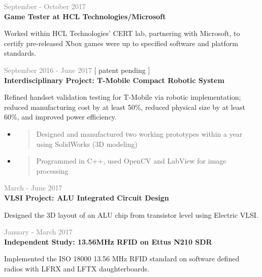 \documentclass[letterpage]{article}
\begin{document}
\begin{minipage}[t]{0.61\linewidth}
\vspace{7px}
\textcolor{gray}{September - October 2017}\\
\textbf{\textsf{Game Tester at HCL Technologies/Microsoft}}\\
\raggedright
Worked within HCL Technologies' CERT lab, partnering with
Microsoft, to certify pre-released Xbox games were
up to specified software and platform standards.

\vspace{7px}
\textcolor{gray}{September 2016 - June 2017}
\quad 
\textcolor{brilliant-azure}{[ patent pending ]}
\\
\textbf{\textsf{Interdisciplinary Project:
		T-Mobile Compact Robotic System}}\\
\raggedright
Refined handset validation testing for T-Mobile via robotic
implementation;\\reduced manufacturing cost by at least 50\%,
reduced physical size by at least 60\%, and improved
power efficiency.\\
\begin{itemize}[leftmargin=*,labelindent=1mm,labelsep=0mm]
\item
  \begin{quote}
  \raggedright
  Designed and manufactured two working prototypes within
  a year using SolidWorks (3D modeling)
  \end{quote}
\item
  \begin{quote}
  \raggedright
  Programmed in C++,
  used OpenCV and LabView for image processing
  \end{quote}
\end{itemize}

\vspace{7px}
\textcolor{gray}{March - June 2017}\\
\textbf{\textsf{VLSI Project: ALU Integrated Circuit Design}}\\
\raggedright
Designed the 3D layout of an ALU chip from transistor level
using Electric VLSI.

\vspace{7px}
\textcolor{gray}{January - March 2017}\\
\textbf{\textsf{Independent Study: 13.56MHz RFID on Ettus N210 SDR}}\\
\raggedright
Implemented the ISO 18000 13.56 MHz RFID standard on software defined
radios with LFRX and LFTX daughterboards.


\end{minipage}
\end{document}
